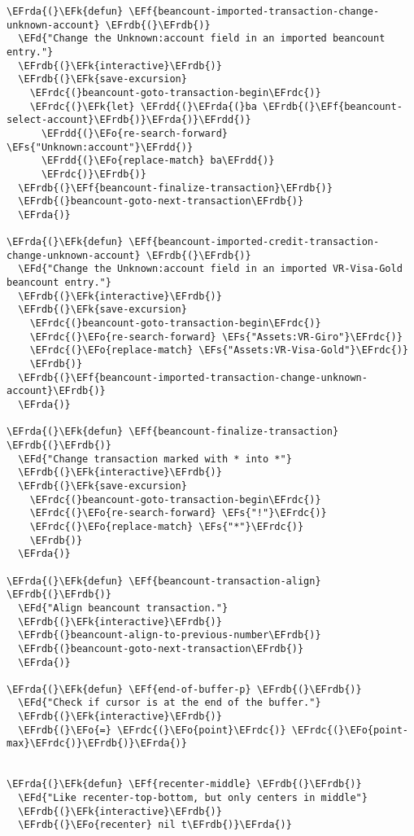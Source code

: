 \documentclass[a4wide,10pt]{article}
\newcommand{\EFs}[1]{\textcolor{EFs}{#1}} %
\newcommand{\EFd}[1]{\textcolor{EFd}{#1}} %
\newcommand{\EFk}[1]{\textcolor{EFk}{#1}} %
\newcommand{\EFf}[1]{\textcolor{EFf}{#1}} %
\newcommand{\EFo}[1]{\textcolor{EFo}{#1}} %
\newcommand{\EFrda}[1]{\textcolor{EFrda}{#1}} %
\newcommand{\EFrdb}[1]{\textcolor{EFrdb}{#1}} %
\newcommand{\EFrdc}[1]{\textcolor{EFrdc}{#1}} %
\newcommand{\EFrdd}[1]{\textcolor{EFrdd}{#1}} %
\begin{document}
\begin{Code}
\begin{Verbatim}
\EFrda{(}\EFk{defun} \EFf{beancount-imported-transaction-change-unknown-account} \EFrdb{(}\EFrdb{)}
  \EFd{"Change the Unknown:account field in an imported beancount entry."}
  \EFrdb{(}\EFk{interactive}\EFrdb{)}
  \EFrdb{(}\EFk{save-excursion}
    \EFrdc{(}beancount-goto-transaction-begin\EFrdc{)}
    \EFrdc{(}\EFk{let} \EFrdd{(}\EFrda{(}ba \EFrdb{(}\EFf{beancount-select-account}\EFrdb{)}\EFrda{)}\EFrdd{)}
      \EFrdd{(}\EFo{re-search-forward} \EFs{"Unknown:account"}\EFrdd{)}
      \EFrdd{(}\EFo{replace-match} ba\EFrdd{)}
      \EFrdc{)}\EFrdb{)}
  \EFrdb{(}\EFf{beancount-finalize-transaction}\EFrdb{)}
  \EFrdb{(}beancount-goto-next-transaction\EFrdb{)}
  \EFrda{)}

\EFrda{(}\EFk{defun} \EFf{beancount-imported-credit-transaction-change-unknown-account} \EFrdb{(}\EFrdb{)}
  \EFd{"Change the Unknown:account field in an imported VR-Visa-Gold beancount entry."}
  \EFrdb{(}\EFk{interactive}\EFrdb{)}
  \EFrdb{(}\EFk{save-excursion}
    \EFrdc{(}beancount-goto-transaction-begin\EFrdc{)}
    \EFrdc{(}\EFo{re-search-forward} \EFs{"Assets:VR-Giro"}\EFrdc{)}
    \EFrdc{(}\EFo{replace-match} \EFs{"Assets:VR-Visa-Gold"}\EFrdc{)}
    \EFrdb{)}
  \EFrdb{(}\EFf{beancount-imported-transaction-change-unknown-account}\EFrdb{)}
  \EFrda{)}

\EFrda{(}\EFk{defun} \EFf{beancount-finalize-transaction} \EFrdb{(}\EFrdb{)}
  \EFd{"Change transaction marked with * into *"}
  \EFrdb{(}\EFk{interactive}\EFrdb{)}
  \EFrdb{(}\EFk{save-excursion}
    \EFrdc{(}beancount-goto-transaction-begin\EFrdc{)}
    \EFrdc{(}\EFo{re-search-forward} \EFs{"!"}\EFrdc{)}
    \EFrdc{(}\EFo{replace-match} \EFs{"*"}\EFrdc{)}
    \EFrdb{)}
  \EFrda{)}

\EFrda{(}\EFk{defun} \EFf{beancount-transaction-align} \EFrdb{(}\EFrdb{)}
  \EFd{"Align beancount transaction."}
  \EFrdb{(}\EFk{interactive}\EFrdb{)}
  \EFrdb{(}beancount-align-to-previous-number\EFrdb{)}
  \EFrdb{(}beancount-goto-next-transaction\EFrdb{)}
  \EFrda{)}

\EFrda{(}\EFk{defun} \EFf{end-of-buffer-p} \EFrdb{(}\EFrdb{)}
  \EFd{"Check if cursor is at the end of the buffer."}
  \EFrdb{(}\EFk{interactive}\EFrdb{)}
  \EFrdb{(}\EFo{=} \EFrdc{(}\EFo{point}\EFrdc{)} \EFrdc{(}\EFo{point-max}\EFrdc{)}\EFrdb{)}\EFrda{)}


\EFrda{(}\EFk{defun} \EFf{recenter-middle} \EFrdb{(}\EFrdb{)}
  \EFd{"Like recenter-top-bottom, but only centers in middle"}
  \EFrdb{(}\EFk{interactive}\EFrdb{)}
  \EFrdb{(}\EFo{recenter} nil t\EFrdb{)}\EFrda{)}


\end{Verbatim}
\end{Code}
\end{document}
